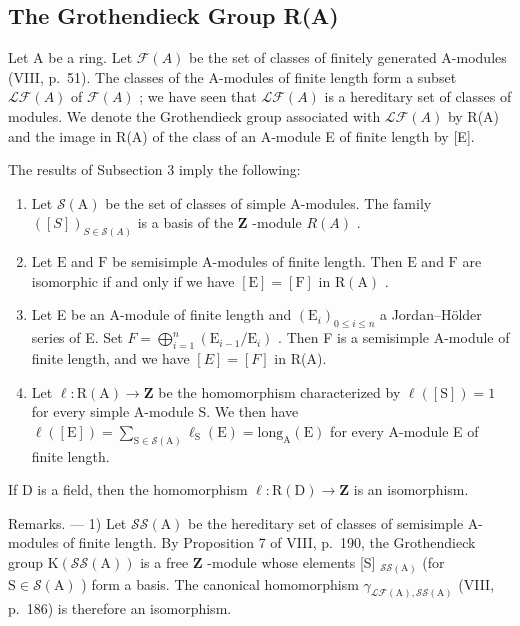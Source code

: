 \subsection{The Grothendieck Group R(A)}

Let A be a ring. Let \(\mathcal{F}(A)\) be the set of classes of finitely generated A-modules (VIII, p.~51). The classes of the A-modules of finite length form a subset \(\mathcal{L}\mathcal{F}(A)\) of \(\mathcal{F}(A)\) ; we have seen that \(\mathcal{L}\mathcal{F}(A)\) is a hereditary set of classes of modules. We denote the Grothendieck group associated with \(\mathcal{L}\mathcal{F}(A)\) by R(A) and the image in R(A) of the class of an A-module E of finite length by {[}E{]}.

The results of Subsection 3 imply the following:

\begin{enumerate}
\def\labelenumi{\alph{enumi})}
\item
  Let \(\mathcal{S}(\mathrm{A})\) be the set of classes of simple A-modules. The family \(([S])_{S\in \mathcal{S}(A)}\) is a basis of the \(\mathbf{Z}\) -module \(R(A)\) .
\item
  Let \(\mathrm{E}\) and \(\mathrm{F}\) be semisimple A-modules of finite length. Then \(\mathrm{E}\) and \(\mathrm{F}\) are isomorphic if and only if we have \([\mathrm{E}] = [\mathrm{F}]\) in \(\mathrm{R(A)}\) .
\item
  Let E be an A-module of finite length and \((\mathrm{E}_{i})_{0\leqslant i\leqslant n}\) a Jordan--Hölder series of E. Set \(F=\bigoplus_{i=1}^{n}(\mathrm{E}_{i-1}/\mathrm{E}_{i})\) . Then F is a semisimple A-module of finite length, and we have \([E]=[F]\) in R(A).
\item
  Let \(\ell : \mathrm{R}(\mathrm{A}) \to \mathbf{Z}\) be the homomorphism characterized by \(\ell([\mathrm{S}]) = 1\) for every simple A-module S. We then have \(\ell([\mathrm{E}]) = \sum_{\mathrm{S} \in \mathcal{S}(\mathrm{A})} \ell_{\mathrm{S}}(\mathrm{E}) = \mathrm{long}_{\mathrm{A}}(\mathrm{E})\) for every A-module E of finite length.
\end{enumerate}

If D is a field, then the homomorphism \(\ell: \mathrm{R}(\mathrm{D}) \to \mathbf{Z}\) is an isomorphism.

Remarks. --- 1) Let \(\mathcal{S}\mathcal{S}(\mathrm{A})\) be the hereditary set of classes of semisimple A-modules of finite length. By Proposition 7 of VIII, p.~190, the Grothendieck group \(\mathrm{K}(\mathcal{S}\mathcal{S}(\mathrm{A}))\) is a free \(\mathbf{Z}\) -module whose elements {[}S{]} \(_{\mathcal{S}\mathcal{S}(\mathrm{A})}\) (for \(\mathrm{S} \in \mathcal{S}(\mathrm{A})\) ) form a basis. The canonical homomorphism \(\gamma_{\mathcal{L}\mathcal{F}(\mathrm{A}),\mathcal{S}\mathcal{S}(\mathrm{A})}\) (VIII, p.~186) is therefore an isomorphism.

